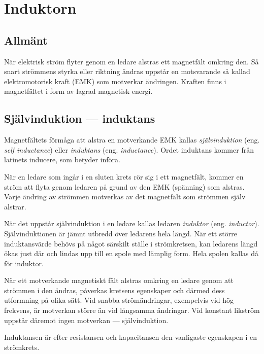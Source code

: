 \section{Induktorn}

\subsection{Allmänt}

När elektrisk ström flyter genom en ledare alstras ett magnetfält omkring
den. Så snart strömmens styrka eller riktning ändras uppstår en motsvarande
så kallad elektromotorisk kraft (EMK) som motverkar ändringen. Kraften finns i
magnetfältet i form av lagrad magnetisk energi.

\subsection{Självinduktion --- induktans}

Magnetfältets förmåga att alstra en motverkande EMK kallas
\emph{självinduktion} (eng. \emph{self inductance}) eller
\emph{induktans} (eng. \emph{inductance}).
Ordet induktans kommer från latinets inducere, som betyder införa.

När en ledare som ingår i en sluten krets rör sig i ett magnetfält, kommer
en ström att flyta genom ledaren på grund av den EMK (spänning) som alstras.
Varje ändring av strömmen motverkas av det magnetfält som strömmen själv
alstrar.

När det uppstår självinduktion i en ledare kallas ledaren \emph{induktor}
(eng. \emph{inductor}).
Självinduktionen är jämnt utbredd över ledarens hela längd. När ett större
induktansvärde behövs på något särskilt ställe i strömkretsen, kan ledarens
längd ökas just där och lindas upp till en spole med lämplig form.
Hela spolen kallas då för induktor.

När ett motverkande magnetiskt fält alstras omkring en ledare genom att strömmen 
i den ändras, påverkas kretsens egenskaper och därmed dess utformning på olika sätt.
Vid snabba strömändringar, exempelvis vid hög frekvens, är motverkan större än vid
långsamma ändringar.
Vid konstant likström uppstår däremot ingen motverkan --- självinduktion.

Induktansen är efter resistansen och kapacitansen den vanligaste egenskapen i
en strömkrets.


